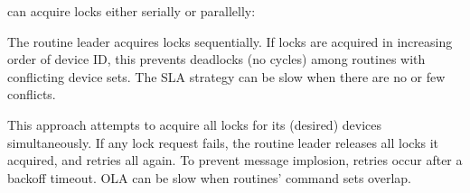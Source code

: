 \sysname{} can acquire locks either serially or parallelly: 

\label{comesh:subsubsec:sla}
The routine leader acquires locks sequentially. If locks are acquired in increasing order of device ID, this prevents deadlocks (no cycles) among routines with conflicting device sets. The SLA strategy can be slow when there are no or few conflicts.

\label{comesh:subsubsec:ola}
This approach attempts to acquire all locks for its (desired) devices simultaneously. If any lock request fails, the routine leader releases all locks it acquired, and retries all again. To prevent message implosion, retries occur after a backoff timeout. OLA can be slow when routines' command sets overlap. 
